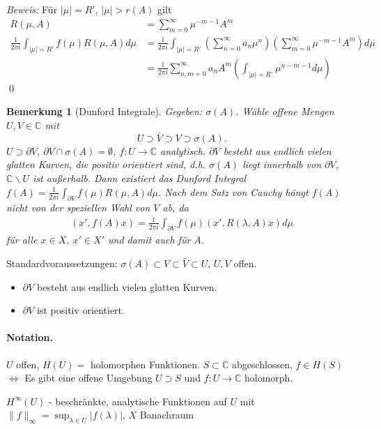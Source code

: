 \documentclass[12pt]{extreport} %
\newtheorem{Bemerkung}[Satz]{Bemerkung}
\numberwithin{equation}{section}
\newcommand{\C}{\mathbb{C}} %
\newcommand{\Bew}{\emph{Beweis: }}
\begin{document}
	\Bew Für $|\mu| = R'$, $|\mu|> r(A)$ gilt 
	\begin{align*}
		R(\mu, A) &= \sum_{m = 0}^{\infty} \mu^{-m-1}A^m\\
		\frac{1}{2\pi i} \int_{|\mu| =R'} f(\mu) R(\mu, A) d\mu &= \frac{1}{2\pi i} \int_{|\mu| = R'} \left(\sum_{n = 0}^{\infty}a_n \mu^n \right) \left(\sum_{m = 0}^{\infty} \mu^{-m-1} A^m \right)d\mu\\
		&= \frac{1}{2\pi i}\sum_{n,m = 0}^{\infty} a_n A^m \left(\int_{|\mu|= R'} \mu^{n-m-1} d\mu \right)
	\end{align*}
	\qed
	
	\begin{Bemerkung}[Dunford Integrale]
		Gegeben: $\sigma(A)$. Wähle offene Mengen $U,V\in \C$ mit 
		$$U\supset \bar V\supset V\supset \sigma(A).$$
		$U\supset \partial V$, $\partial V\cap \sigma(A) =\emptyset$, $f\colon U\rightarrow \C$ analytisch. $\partial V$ besteht aus endlich vielen glatten Kurven, die positiv orientiert sind, d.h. $\sigma(A)$ liegt innerhalb von $\partial V$, $\C\backslash U$ ist außerhalb. Dann existiert das Dunford Integral $f(A) = \frac{1}{2\pi i}\int_{\partial V} f(\mu) R(\mu, A)d\mu$. Nach dem Satz von Cauchy hängt $f(A)$ nicht von der speziellen Wahl von $V$ ab, da 
		\begin{align*}
			(x',f(A)x) = \frac{1}{2\pi i}\int_{\partial V} f(\mu)(x', R(\lambda, A)x)d\mu
		\end{align*}
		für alle $x\in X$, $x'\in X'$ und damit auch für $A$.
	\end{Bemerkung}
	
	Standardvoraussetzungen: $\sigma(A)\subset V\subset \bar V\subset U$, $U,V$ offen.
	\begin{itemize}
		\item $\partial V$ besteht aus endlich vielen glatten Kurven. 
		\item $\partial V$ ist positiv orientiert.
	\end{itemize}
	
	\paragraph{Notation.} $U$ offen, $H(U) =$ holomorphen Funktionen. $S\subset \C$ abgeschlossen, $f\in H(S)$ $\Leftrightarrow$ Es gibt eine offene Umgebung $U\supset S$ und $f\colon U\rightarrow \C$ holomorph.
	
	$H^\infty(U)$ - beschränkte, analytische Funktionen auf $U$ mit $\|f\|_\infty = \sup_{\lambda\in U} |f(\lambda)|$, $X$ Banachraum
	
\end{document}
